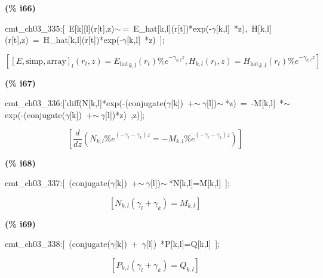 \documentclass[fleqn]{article}
\begin{document}
\noindent
\begin{minipage}[t]{4.000000em}\color{red}\bfseries
(\% i66)	
\end{minipage}
\begin{minipage}[t]{\textwidth}\color{blue}
cmt\_ch03\_335:[\ E[k][l](r[t],z)\ensuremath{\sim\ }=\ E\_hat[k,l](r[t])*exp(-\ensuremath{\gamma}[k,l]\ *z),\ H[k,l](r[t],z)\ =\ H\_hat[k,l](r[t])*exp(-\ensuremath{\gamma}[k,l]\ *z)\ ];
\end{minipage}
\[\displaystyle \tag{cmt\_ ch03\_ 335} 
\left[ {{\left[ E\operatorname{,}\ensuremath{\mathrm{simp}}\operatorname{,}\ensuremath{\mathrm{array}}\right] }_l}\left( {r_t}\operatorname{,}z\right) ={{{E_{\ensuremath{\mathrm{hat}}}}}_{k,l}}\left( {r_t}\right)  {{\% e}^{-{{\gamma }_{k,l}} z}}\operatorname{,}{H_{k,l}}\left( {r_t}\operatorname{,}z\right) ={{{H_{\ensuremath{\mathrm{hat}}}}}_{k,l}}\left( {r_t}\right)  {{\% e}^{-{{\gamma }_{k,l}} z}}\right] \mbox{}
\]


\noindent
\begin{minipage}[t]{4.000000em}\color{red}\bfseries
(\% i67)	
\end{minipage}
\begin{minipage}[t]{\textwidth}\color{blue}
cmt\_ch03\_336:['diff(N[k,l]*exp(-(conjugate(\ensuremath{\gamma}[k])\ +\ensuremath{\sim\ }\ensuremath{\gamma}[l])\ensuremath{\sim\ }*z)\ =\ -M[k,l]\ *\ensuremath{\sim\ }exp(-(conjugate(\ensuremath{\gamma}[k])\ +\ensuremath{\sim\ }\ensuremath{\gamma}[l])*z)\ ,z)];
\end{minipage}
\[\displaystyle \tag{cmt\_ ch03\_ 336} 
\left[ \frac{d}{d z} \left( {N_{k,l}} {{\% e}^{\left( -{{\gamma }_l}-{{\gamma }_k}\right)  z}}=-{M_{k,l}} {{\% e}^{\left( -{{\gamma }_l}-{{\gamma }_k}\right)  z}}\right) \right] \mbox{}
\]


\noindent
\begin{minipage}[t]{4.000000em}\color{red}\bfseries
(\% i68)	
\end{minipage}
\begin{minipage}[t]{\textwidth}\color{blue}
cmt\_ch03\_337:[\ (conjugate(\ensuremath{\gamma}[k])\ +\ensuremath{\sim\ }\ensuremath{\gamma}[l])\ensuremath{\sim\ }*N[k,l]=M[k,l]\ ];
\end{minipage}
\[\displaystyle \tag{cmt\_ ch03\_ 337} 
\left[ {N_{k,l}} \left( {{\gamma }_l}+{{\gamma }_k}\right) ={M_{k,l}}\right] \mbox{}
\]


\noindent
\begin{minipage}[t]{4.000000em}\color{red}\bfseries
(\% i69)	
\end{minipage}
\begin{minipage}[t]{\textwidth}\color{blue}
cmt\_ch03\_338:[\ (conjugate(\ensuremath{\gamma}[k])\ +\ \ensuremath{\gamma}[l])\ *P[k,l]=Q[k,l]\ ];
\end{minipage}
\[\displaystyle \tag{cmt\_ ch03\_ 338} 
\left[ {P_{k,l}} \left( {{\gamma }_l}+{{\gamma }_k}\right) ={Q_{k,l}}\right] \mbox{}
\]
\end{document}
